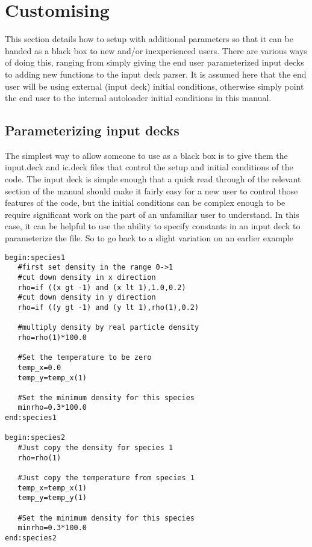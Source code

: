 \documentclass[12pt,a4paper]{article}
\newcommand{\simpleboxverbatim}{\begin{Verbatim}[obeytabs=true,frame=single,
  framerule=0.5mm,rulecolor=\color{warwickmid},formatcom=\color{black}]}
\newcommand{\EPOCH}{{\color{warwickdark}\fontfamily{phv}\selectfont{EPOCH}}}
\begin{document}
\section{Customising {\EPOCH}}
This section details how to setup {\EPOCH} with additional parameters so that it
can be handed as a black box to new and/or inexperienced users. There are
various ways of doing this, ranging from simply giving the end user
parameterized input decks to adding new functions to the input deck parser. It
is assumed here that the end user will be using external (input deck) initial
conditions, otherwise simply point the end user to the internal autoloader
initial conditions in this manual.

\subsection{Parameterizing input decks}
The simplest way to allow someone to use {\EPOCH} as a black box is to give them
the input.deck and ic.deck files that control the setup and initial conditions
of the code. The input deck is simple enough that a quick read through of the
relevant section of the manual should make it fairly easy for a new user to
control those features of the code, but the initial conditions can be complex
enough to be require significant work on the part of an unfamiliar user to
understand. In this case, it can be helpful to use the ability to specify
constants in an input deck to parameterize the file. So to go back to a slight
variation on an earlier example


 \simpleboxverbatim
begin:species1
   #first set density in the range 0->1
   #cut down density in x direction
   rho=if ((x gt -1) and (x lt 1),1.0,0.2)
   #cut down density in y direction
   rho=if ((y gt -1) and (y lt 1),rho(1),0.2)

   #multiply density by real particle density
   rho=rho(1)*100.0

   #Set the temperature to be zero
   temp_x=0.0
   temp_y=temp_x(1)

   #Set the minimum density for this species
   minrho=0.3*100.0
end:species1

begin:species2
   #Just copy the density for species 1
   rho=rho(1)

   #Just copy the temperature from species 1
   temp_x=temp_x(1)
   temp_y=temp_y(1)

   #Set the minimum density for this species
   minrho=0.3*100.0
end:species2
\end{Verbatim}
\end{document}
